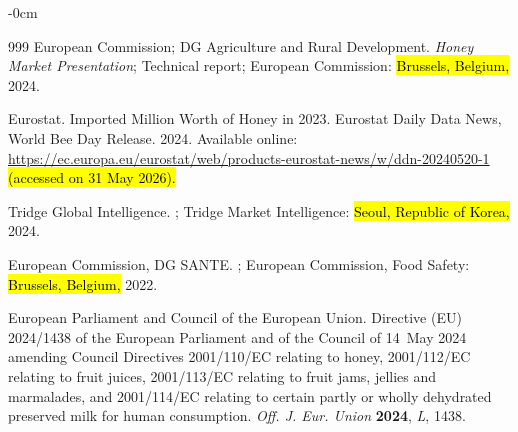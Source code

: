 \documentclass[foods,review,accept,pdftex,moreauthors]{Definitions/mdpi}
\begin{document}
{\begin{adjustwidth}{-\extralength}{0cm}
\begin{thebibliography}{999}
{European Commission; DG Agriculture and Rural Development}.
\newblock \emph{Honey Market Presentation}; 
\newblock Technical report; European Commission: \hl{Brussels, Belgium,} 
  2024.

{Eurostat}.
 Imported  Million Worth of Honey in 2023.
\newblock Eurostat Daily Data News, World Bee Day Release.  2024.  Available online:  \url{https://ec.europa.eu/eurostat/web/products-eurostat-news/w/ddn-20240520-1}  \hl{(accessed on 31 May 2026).} %


{Tridge Global Intelligence}.
; 
\newblock Tridge Market Intelligence: \hl{Seoul, Republic of Korea,} 
  2024.

{European Commission, DG SANTE}.
;
\newblock European Commission, Food Safety: \hl{Brussels, Belgium,} 
  2022.

{European Parliament and Council of the European Union}.
\newblock Directive ({EU}) 2024/1438 of the {European Parliament} and of the
  Council of 14~{May} 2024 amending {Council} {Directives} 2001/110/{EC}
  relating to honey, 2001/112/{EC} relating to fruit juices, 2001/113/{EC}
  relating to fruit jams, jellies and marmalades, and 2001/114/{EC} relating to
  certain partly or wholly dehydrated preserved milk for human consumption.
\newblock \emph{Off. J. Eur. Union}  \textbf{2024}, \emph{L}, 1438.


\end{thebibliography}
\end{adjustwidth}}
\end{document}
